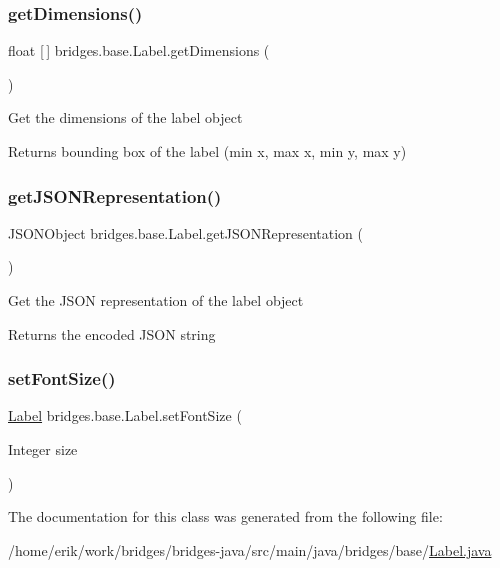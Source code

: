 \subsubsection{\texorpdfstring{get\+Dimensions()}{getDimensions()}}
{\footnotesize\ttfamily float \mbox{[}$\,$\mbox{]} bridges.\+base.\+Label.\+get\+Dimensions (\begin{DoxyParamCaption}{ }\end{DoxyParamCaption})}

Get the dimensions of the label object \begin{DoxyReturn}{Returns}
bounding box of the label (min x, max x, min y, max y) 
\end{DoxyReturn}
\mbox{\label{classbridges_1_1base_1_1_label_a6befc6655ce36868213be289571c6315}} 
\subsubsection{\texorpdfstring{get\+J\+S\+O\+N\+Representation()}{getJSONRepresentation()}}
{\footnotesize\ttfamily J\+S\+O\+N\+Object bridges.\+base.\+Label.\+get\+J\+S\+O\+N\+Representation (\begin{DoxyParamCaption}{ }\end{DoxyParamCaption})}

Get the J\+S\+ON representation of the label object

\begin{DoxyReturn}{Returns}
the encoded J\+S\+ON string 
\end{DoxyReturn}
\mbox{\label{classbridges_1_1base_1_1_label_ab5f2d60e519db2499f326c4ccb967b25}} 
\subsubsection{\texorpdfstring{set\+Font\+Size()}{setFontSize()}}
{\footnotesize\ttfamily \hyperlink{classbridges_1_1base_1_1_label}{Label} bridges.\+base.\+Label.\+set\+Font\+Size (\begin{DoxyParamCaption}\item[{Integer}]{size }\end{DoxyParamCaption})}



The documentation for this class was generated from the following file\+:\begin{DoxyCompactItemize}
\item 
/home/erik/work/bridges/bridges-\/java/src/main/java/bridges/base/\hyperlink{_label_8java}{Label.\+java}\end{DoxyCompactItemize}
